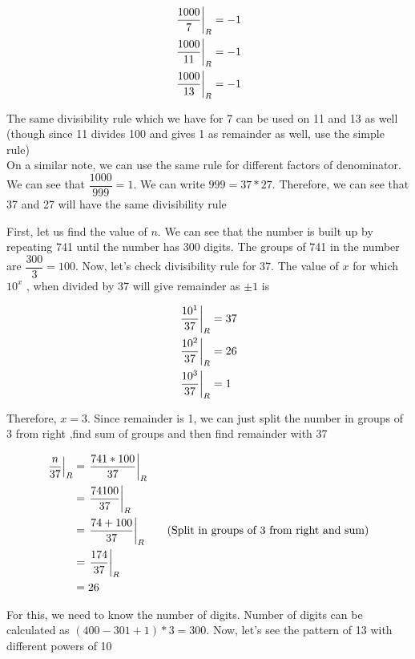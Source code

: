 \begin{align*}
    \displaystyle{ \left. \frac{1000}{7} \right |_{R} } &= -1 \\
    \displaystyle{ \left. \frac{1000}{11} \right |_{R} } &= -1 \\
    \displaystyle{ \left. \frac{1000}{13} \right |_{R} } &= -1
\end{align*}

The same divisibility rule which we have for 7 can be used on 11 and 13 as well (though since 11 divides 100 and gives 1 as remainder as well, use the simple rule) \\

On a similar note, we can use the same rule for different factors of denominator. We can see that $\dfrac{1000}{999} = 1$. We can write $999 = 37 * 27$. Therefore, we can see that 37 and 27 will have the same divisibility rule


First, let us find the value of $n$. We can see that the number is built up by repeating 741 until the number has 300 digits. The groups of 741 in the number are $\dfrac{300}{3} = 100$. Now, let's check divisibility rule for 37. The value of $x$ for which $10^x$ , when divided by 37 will give remainder as $\pm1$ is

\begin{align*}
    \displaystyle{ \left. \frac{10^1}{37} \right |_{R} } &= 37 \\
    \displaystyle{ \left. \frac{10^2}{37} \right |_{R} } &= 26 \\
    \displaystyle{ \left. \frac{10^3}{37} \right |_{R} } &= 1
\end{align*}

Therefore, $x=3$. Since remainder is 1, we can just split the number in groups of 3 from right ,find sum of groups and then find remainder with 37

\begin{align*}
    \displaystyle{ \left. \frac{n}{37} \right |_{R} } &= \displaystyle{ \left. \frac{741 * 100}{37} \right |_{R} } \\
    &= \displaystyle{ \left. \frac{74100}{37} \right |_{R} } \\
    &= \displaystyle{ \left. \frac{74 + 100}{37} \right |_{R} } \tag{Split in groups of 3 from right and sum} \\
    &= \displaystyle{ \left. \frac{174}{37} \right |_{R} } \\
    &= 26
\end{align*}


For this, we need to know the number of digits. Number of digits can be calculated as $(400 - 301 + 1) * 3 = 300$. Now, let's see the pattern of 13 with different powers of 10

